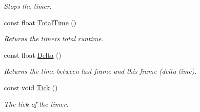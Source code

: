 \begin{DoxyCompactItemize}
\begin{DoxyCompactList}\small\item\em Stops the timer. \end{DoxyCompactList}\item 
const float \hyperlink{class_ensum_1_1_core_1_1_timer_a41ef243e3c8538b48e50096f1bfe8ad3}{Total\+Time} ()\hypertarget{class_ensum_1_1_core_1_1_timer_a41ef243e3c8538b48e50096f1bfe8ad3}{}\label{class_ensum_1_1_core_1_1_timer_a41ef243e3c8538b48e50096f1bfe8ad3}

\begin{DoxyCompactList}\small\item\em Returns the timers total runtime. \end{DoxyCompactList}\item 
const float \hyperlink{class_ensum_1_1_core_1_1_timer_ad51253e9d84426e84728ec47c9532654}{Delta} ()\hypertarget{class_ensum_1_1_core_1_1_timer_ad51253e9d84426e84728ec47c9532654}{}\label{class_ensum_1_1_core_1_1_timer_ad51253e9d84426e84728ec47c9532654}

\begin{DoxyCompactList}\small\item\em Returns the time between last frame and this frame (delta time). \end{DoxyCompactList}\item 
const void \hyperlink{class_ensum_1_1_core_1_1_timer_a72e9509a79aad7d8ea103492c9c8124d}{Tick} ()
\begin{DoxyCompactList}\small\item\em The tick of the timer. \end{DoxyCompactList}\end{DoxyCompactItemize}
